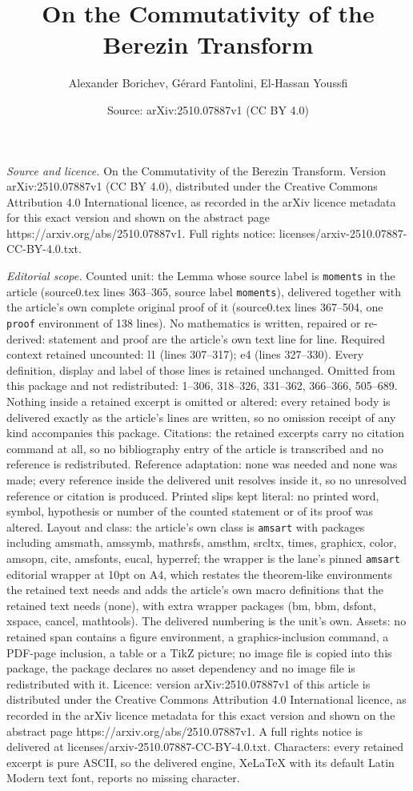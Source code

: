 \documentclass[10pt,a4paper]{amsart}
\title[On the Commutativity of the Berezin Transform]{On the Commutativity of the Berezin Transform}
\author{Alexander Borichev, G\'erard Fantolini, El-Hassan Youssfi}
\date{Source: arXiv:2510.07887v1 (CC BY 4.0)}
\begin{document}
\maketitle

\noindent\emph{Source and licence.} On the Commutativity of the Berezin Transform. Version arXiv:2510.07887v1 (CC BY 4.0), distributed under the Creative Commons Attribution 4.0 International licence, as recorded in the arXiv licence metadata for this exact version and shown on the abstract page https://arxiv.org/abs/2510.07887v1. Full rights notice: licenses/arxiv-2510.07887-CC-BY-4.0.txt.\par\smallskip

\noindent\textit{Editorial scope.} Counted unit: the Lemma whose source label is \texttt{moments} in the article (source0.tex lines 363--365, source label \texttt{moments}), delivered together with the article's own complete original proof of it (source0.tex lines 367--504, one \texttt{proof} environment of 138 lines). No mathematics is written, repaired or re-derived: statement and proof are the article's own text line for line. Required context retained uncounted: l1 (lines 307--317); e4 (lines 327--330). Every definition, display and label of those lines is retained unchanged. Omitted from this package and not redistributed: 1--306, 318--326, 331--362, 366--366, 505--689. Nothing inside a retained excerpt is omitted or altered: every retained body is delivered exactly as the article's lines are written, so no omission receipt of any kind accompanies this package. Citations: the retained excerpts carry no citation command at all, so no bibliography entry of the article is transcribed and no reference is redistributed. Reference adaptation: none was needed and none was made; every reference inside the delivered unit resolves inside it, so no unresolved reference or citation is produced. Printed slips kept literal: no printed word, symbol, hypothesis or number of the counted statement or of its proof was altered. Layout and class: the article's own class is \texttt{amsart} with packages including amsmath, amssymb, mathrsfs, amsthm, srcltx, times, graphicx, color, amsopn, cite, amsfonts, eucal, hyperref; the wrapper is the lane's pinned \texttt{amsart} editorial wrapper at 10pt on A4, which restates the theorem-like environments the retained text needs and adds the article's own macro definitions that the retained text needs (none), with extra wrapper packages (bm, bbm, dsfont, xspace, cancel, mathtools). The delivered numbering is the unit's own. Assets: no retained span contains a figure environment, a graphics-inclusion command, a PDF-page inclusion, a table or a TikZ picture; no image file is copied into this package, the package declares no asset dependency and no image file is redistributed with it. Licence: version arXiv:2510.07887v1 of this article is distributed under the Creative Commons Attribution 4.0 International licence, as recorded in the arXiv licence metadata for this exact version and shown on the abstract page https://arxiv.org/abs/2510.07887v1. A full rights notice is delivered at licenses/arxiv-2510.07887-CC-BY-4.0.txt. Characters: every retained excerpt is pure ASCII, so the delivered engine, XeLaTeX with its default Latin Modern text font, reports no missing character.
\end{document}
